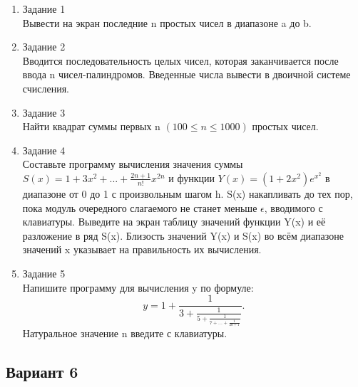 \documentclass[a4paper]{article}
\begin{document}
	\begin{enumerate} 
		\item Задание 1 \\
			Вывести на экран последние n простых чисел в диапазоне a до b.\\
		\item Задание 2\\
			Вводится последовательность целых чисел, которая заканчивается после ввода n чисел-палиндромов.  
			Введенные числа вывести в двоичной системе счисления.\\
		\item Задание 3 \\
			Найти квадрат суммы первых n $(100 \le n \le 1000) $ простых чисел.\\
		\item Задание 4 \\
			Составьте программу вычисления значения суммы  $S(x)=1+3x^2+...+\frac{2n+1}{n!}x^{2n}$
			и функции $Y(x)=(1+2x^2)e^{x^2}$ в диапазоне от 0 до 1
			с произвольным шагом h. S(x) накапливать до тех пор, пока модуль очередного слагаемого не станет меньше $\epsilon$, вводимого с клавиатуры. Выведите на экран таблицу значений функции Y(x) и её разложение в ряд S(x). Близость значений Y(x) и S(x) во всём диапазоне
			значений x указывает на правильность их вычисления.\\
		\item Задание 5 \\
			Напишите программу для вычисления y по формуле:
			$$y=1+\frac{1}{3+\frac{1}{5+\frac{1}{7+...+\frac{1}{2n+1}}}}.$$
			Натуральное значение n введите с клавиатуры.\\
	\end{enumerate}
	\newpage
	\begin{center}
		\subsection*{Вариант 6}
	\end{center}
\end{document}

